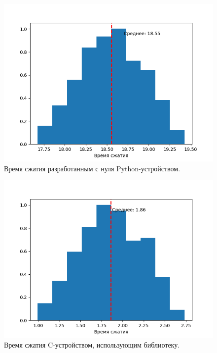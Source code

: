 \begin{figure}[!htbp]
    \centering
    \begin{adjustbox}{max totalsize={0.8\textwidth}{\textheight}}
        \includegraphics{images/hist-handmade-py-dev.png}
    \end{adjustbox}
    \caption{Время сжатия разработанным с нуля Python-устройством.}\label{fig:hist-handmade-py-dev}
\end{figure}


\begin{figure}[!htbp]
    \centering
    \begin{adjustbox}{max totalsize={0.8\textwidth}{\textheight}}
        \includegraphics{images/hist-lib-c-dev.png}
    \end{adjustbox}
    \caption{Время сжатия C-устройством, использующим библиотеку.}\label{fig:hist-lib-c-dev}
\end{figure}


